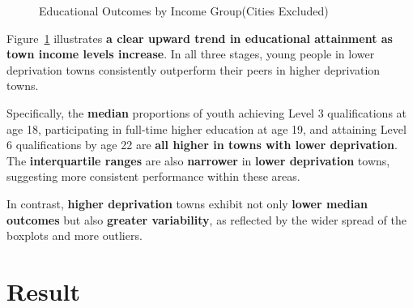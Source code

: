 \documentclass[11pt,en]{../resources/elegantpaper}
\begin{document}
\begin{figure}[H]


\caption{\label{fig-edu_outcomes_boxplot}Educational Outcomes by Income
Group(Cities Excluded)}

\end{figure}%

Figure~\ref{fig-edu_outcomes_boxplot} illustrates \textbf{a clear upward
trend in educational attainment as town income levels increase}. In all
three stages, young people in lower deprivation towns consistently
outperform their peers in higher deprivation towns.

Specifically, the \textbf{median} proportions of youth achieving Level 3
qualifications at age 18, participating in full-time higher education at
age 19, and attaining Level 6 qualifications by age 22 are \textbf{all
higher in towns with lower deprivation}. The \textbf{interquartile
ranges} are also \textbf{narrower} in \textbf{lower deprivation} towns,
suggesting more consistent performance within these areas.

In contrast, \textbf{higher deprivation} towns exhibit not only
\textbf{lower median outcomes} but also \textbf{greater variability}, as
reflected by the wider spread of the boxplots and more outliers.

\section{Result}\label{result}
\end{document}
